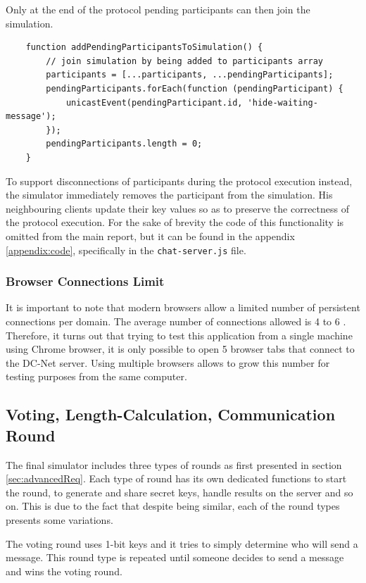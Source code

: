 Only at the end of the protocol pending participants can then join the simulation.

\begin{lstlisting}
    function addPendingParticipantsToSimulation() {
        // join simulation by being added to participants array
        participants = [...participants, ...pendingParticipants];
        pendingParticipants.forEach(function (pendingParticipant) {
            unicastEvent(pendingParticipant.id, 'hide-waiting-message');
        });
        pendingParticipants.length = 0;
    }
\end{lstlisting} 


To support disconnections of participants during the protocol execution instead, the simulator immediately removes the participant from the simulation. His neighbouring clients update their key values so as to preserve the correctness of the protocol execution. For the sake of brevity the code of this functionality is omitted from the main report, but it can be found in the appendix \ref{appendix:code}, specifically in the \lstinline{chat-server.js} file.

\subsubsection{Browser Connections Limit}
It is important to note that modern browsers allow a limited number of persistent connections per domain. The average number of connections allowed is 4 to 6 \cite{Souders}. Therefore, it turns out that trying to test this application from a single machine using Chrome browser, it is only possible to open 5 browser tabs that connect to the DC-Net server. Using multiple browsers allows to grow this number for testing purposes from the same computer.


\subsection{Voting, Length-Calculation, Communication Round}
The final simulator includes three types of rounds as first presented in section \ref{sec:advancedReq}. Each type of round has its own dedicated functions to start the round, to generate and share secret keys, handle results on the server and so on. This is due to the fact that despite being similar, each of the round types presents some variations.

The voting round uses 1-bit keys and it tries to simply determine who will send a message. This round type is repeated until someone decides to send a message and wins the voting round.

